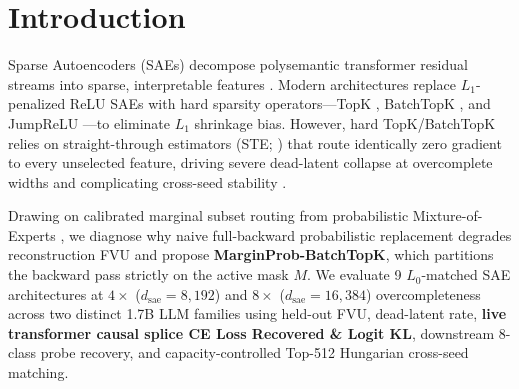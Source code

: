 \documentclass[10pt,twocolumn]{article}
\begin{document}
\section{Introduction}
Sparse Autoencoders (SAEs) decompose polysemantic transformer residual streams into sparse, interpretable features \citep{bricken2023monosemanticity,cunningham2024sae}. Modern architectures replace $L_1$-penalized ReLU SAEs with hard sparsity operators---TopK \citep{gao2024scaling}, BatchTopK \citep{bussmann2024batchtopk}, and JumpReLU \citep{rajamanoharan2024jumprelu}---to eliminate $L_1$ shrinkage bias. However, hard TopK/BatchTopK relies on straight-through estimators (STE; \citealt{bengio2013ste}) that route identically zero gradient to every unselected feature, driving severe dead-latent collapse at overcomplete widths and complicating cross-seed stability \citep{paulo2025sae}.

Drawing on calibrated marginal subset routing from probabilistic Mixture-of-Experts \citep{probmoe2026}, we diagnose why naive full-backward probabilistic replacement degrades reconstruction FVU and propose \textbf{MarginProb-BatchTopK}, which partitions the backward pass strictly on the active mask $M$. We evaluate 9 $L_0$-matched SAE architectures at $4\times$ ($d_{\mathrm{sae}}=8{,}192$) and $8\times$ ($d_{\mathrm{sae}}=16{,}384$) overcompleteness across two distinct 1.7B LLM families using held-out FVU, dead-latent rate, \textbf{live transformer causal splice CE Loss Recovered \& Logit KL}, downstream 8-class probe recovery, and capacity-controlled Top-512 Hungarian cross-seed matching.
\end{document}
